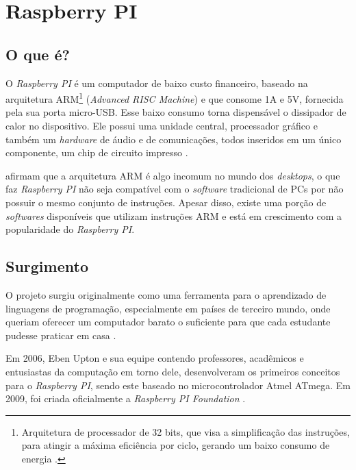 \documentclass[
	12pt,				%
	openright,			%
	twoside,			%
	a4paper,			%
	chapter=TITLE,		%
	english,			%
	brazil				%
	]{abntex2}
\begin{document}
\newpage



\section{Raspberry PI}
\label{refe:raspberry}

\subsection{O que é?}


O \textit{Raspberry PI} é um computador de baixo custo financeiro, baseado na arquitetura ARM\footnote{Arquitetura de processador de 32 bits, que visa a simplificação das instruções, para atingir a máxima eficiência por ciclo, gerando um baixo consumo de energia \cite{arm}.} (\textit{Advanced RISC Machine}) e que consome 1A e 5V, fornecida pela sua porta micro-USB. Esse baixo consumo torna dispensável o dissipador de calor no dispositivo. Ele possui uma unidade central, processador gráfico e também um \textit{hardware} de áudio e de comunicações, todos inseridos em um único componente, um chip de circuito impresso \cite{eben2013raspberry, raspberrypi.org}.

 afirmam que a arquitetura ARM é algo incomum no mundo dos \textit{desktops}, o que faz \textit{Raspberry PI} não seja compatível com o \textit{software} tradicional de PCs por não possuir o mesmo conjunto de instruções. Apesar disso, existe uma porção de \textit{softwares} disponíveis que utilizam instruções ARM e está em crescimento com a popularidade do \textit{Raspberry PI}.


\subsection{Surgimento}

O projeto surgiu originalmente como uma ferramenta para o aprendizado de linguagens de programação, especialmente em países de terceiro mundo, onde queriam oferecer um computador barato o suficiente para que cada estudante pudesse praticar em casa \cite{ClubeHardware}.

Em 2006, Eben Upton e sua equipe contendo professores, acadêmicos e entusiastas da computação em torno dele, desenvolveram os primeiros conceitos para o \textit{Raspberry PI}, sendo este baseado no microcontrolador Atmel ATmega. Em 2009, foi criada oficialmente a \textit{Raspberry PI Foundation} \cite{eben2013raspberry}. 
\end{document}
